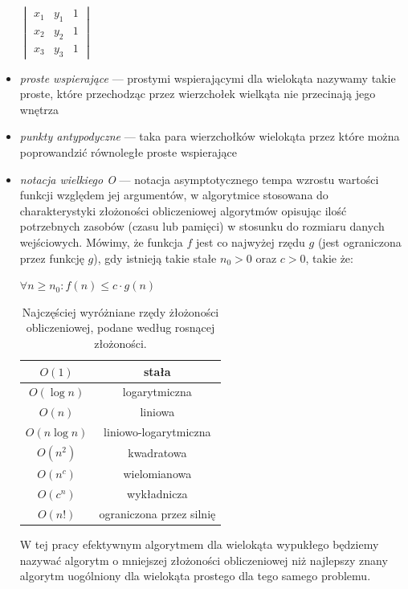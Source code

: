 \documentclass[12pt,oneside,brudnopis]{xelatex-mgr/xmgr}
\begin{document}
\begin{itemize}
  \begin{center}
    \begin{math}
      \begin{vmatrix}
        x_1 & y_1 & 1 \\
        x_2 & y_2 & 1 \\
        x_3 & y_3 & 1
      \end{vmatrix}
    \end{math}
  \end{center}

\item{\emph{proste wspierające}} --- prostymi wspierającymi dla wielokąta
  nazywamy takie proste, które przechodząc przez wierzchołek wielkąta
  nie przecinają jego wnętrza

\item{\emph{punkty antypodyczne}} --- taka para wierzchołków wielokąta przez
  które można poprowandzić równoległe proste wspierające

\item{\emph{notacja wielkiego O}} --- notacja asymptotycznego tempa
  wzrostu wartości funkcji względem jej argumentów, w algorytmice
  stosowana do charakterystyki złożoności obliczeniowej algorytmów
  opisując ilość potrzebnych zasobów (czasu lub pamięci) w stosunku do
  rozmiaru danych wejściowych. Mówimy, że funkcja $f$ jest co najwyżej
  rzędu $g$ (jest ograniczona przez funkcję $g$), gdy istnieją takie
  stałe $n_0 > 0$ oraz $c > 0$, takie że:

  \begin{center}
    $\forall n \geq n_0 : f(n) \leq c \cdot g(n)$
  \end{center}

  \begin{table}[htp]
    \centering
    \caption{Najczęściej wyróżniane rzędy żłożoności obliczeniowej,
      podane według rosnącej złożoności.}
    \begin{tabular}{c c}
      $O(1)$ & stała \\
      \hline
      $O(\log n)$ & logarytmiczna \\
      \hline
      $O(n)$ & liniowa \\
      \hline
      $O(n \log n)$ & liniowo-logarytmiczna \\
      \hline
      $O(n^2)$ & kwadratowa \\
      \hline
      $O(n^c)$ & wielomianowa \\
      \hline
      $O(c^n)$ & wykładnicza \\
      \hline
      $O(n!)$ & ograniczona przez silnię \\
    \end{tabular}
  \end{table}

  W tej pracy efektywnym algorytmem dla wielokąta wypukłego będziemy
  nazywać algorytm o mniejszej złożoności obliczeniowej niż najlepszy
  znany algorytm uogólniony dla wielokąta prostego dla tego samego
  problemu.
\end{itemize}
\end{document}
